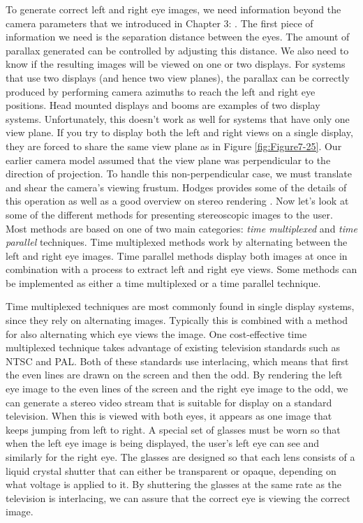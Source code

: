 To generate correct left and right eye images, we need information beyond the camera parameters that we introduced in Chapter 3: . The first piece of information we need is the separation distance between the eyes. The amount of parallax generated can be controlled by adjusting this distance. We also need to know if the resulting images will be viewed on one or two displays. For systems that use two displays (and hence two view planes), the parallax can be correctly produced by performing camera azimuths to reach the left and right eye positions. Head mounted displays and booms are examples of two display systems. Unfortunately, this doesn't work as well for systems that have only one view plane. If you try to display both the left and right views on a single display, they are forced to share the same view plane as in Figure \ref{fig:Figure7-25}. Our earlier camera model assumed that the view plane was perpendicular to the direction of projection. To handle this non-perpendicular case, we must translate and shear the camera's viewing frustum. Hodges provides some of the details of this operation as well as a good overview on stereo rendering \cite{Hodges92}.  Now let's look at some of the different methods for presenting stereoscopic images to the user. Most methods are based on one of two main categories: \emph{time multiplexed} and \emph{time parallel} techniques. Time multiplexed methods work by alternating between the left and right eye images. Time parallel methods display both images at once in combination with a process to extract left and right eye views. Some methods can be implemented as either a time multiplexed or a time parallel technique.

Time multiplexed techniques are most commonly found in single display systems, since they rely on alternating images. Typically this is combined with a method for also alternating which eye views the image. One cost-effective time multiplexed technique takes advantage of existing television standards such as NTSC and PAL. Both of these standards use interlacing, which means that first the even lines are drawn on the screen and then the odd. By rendering the left eye image to the even lines of the screen and the right eye image to the odd, we can generate a stereo video stream that is suitable for display on a standard television. When this is viewed with both eyes, it appears as one image that keeps jumping from left to right. A special set of glasses must be worn so that when the left eye image is being displayed, the user's left eye can see and similarly for the right eye. The glasses are designed so that each lens consists of a liquid crystal shutter that can either be transparent or opaque, depending on what voltage is applied to it. By shuttering the glasses at the same rate as the television is interlacing, we can assure that the correct eye is viewing the correct image.


